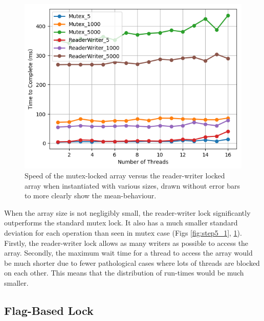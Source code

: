 \documentclass[11pt]{article}
\begin{document}
\begin{figure}
\centering
\includegraphics[scale=0.65]{step5_2.png}
\caption{Speed of the mutex-locked array versus the reader-writer locked array when instantiated with various sizes, drawn without error bars to more clearly show the mean-behaviour.}
\label{fig:step5_2}
\end{figure}

When the array size is not negligibly small, the reader-writer lock significantly outperforms the standard mutex lock. It also has a much smaller standard deviation for each operation than seen in mutex case (Figs \ref{fig:step5_1}, \ref{fig:step5_2}). Firstly, the reader-writer lock allows as many writers as possible to access the array. Secondly, the maximum wait time for a thread to access the array would be much shorter due to fewer pathological cases where lots of threads are blocked on each other. This means that the distribution of run-times would be much smaller.


\subsection{Flag-Based Lock}
\end{document}
